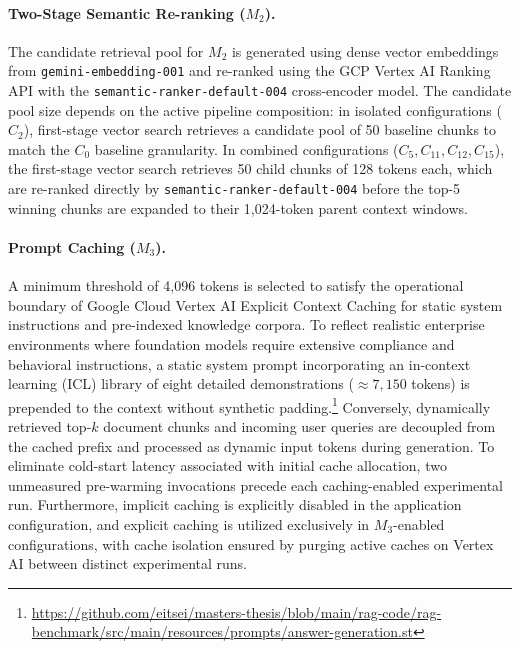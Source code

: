 \paragraph{Two-Stage Semantic Re-ranking ($M_2$).}
The candidate retrieval pool for $M_2$ is generated using dense vector embeddings from \texttt{gemini-embedding-001} and re-ranked using the GCP Vertex AI Ranking API with the \texttt{semantic-\allowbreak{}ranker-\allowbreak{}default-\allowbreak{}004} cross-encoder model. The candidate pool size depends on the active pipeline composition: in isolated configurations ($C_2$), first-stage vector search retrieves a candidate pool of 50 baseline chunks to match the $C_0$ baseline granularity. In combined configurations ($C_5, C_{11}, C_{12}, C_{15}$), the first-stage vector search retrieves 50 child chunks of 128 tokens each, which are re-ranked directly by \texttt{semantic-\allowbreak{}ranker-\allowbreak{}default-\allowbreak{}004} before the top-5 winning chunks are expanded to their 1,024-token parent context windows.

\paragraph{Prompt Caching ($M_3$).}
A minimum threshold of 4,096 tokens is selected to satisfy the operational boundary of Google Cloud Vertex AI Explicit Context Caching for static system instructions and pre-indexed knowledge corpora. To reflect realistic enterprise environments where foundation models require extensive compliance and behavioral instructions, a static system prompt incorporating an in-context learning (ICL) library of eight detailed demonstrations ($\approx 7{,}150$ tokens) is prepended to the context without synthetic padding.\footnote{\url{https://github.com/eitsei/masters-thesis/blob/main/rag-code/rag-benchmark/src/main/resources/prompts/answer-generation.st}} Conversely, dynamically retrieved top-$k$ document chunks and incoming user queries are decoupled from the cached prefix and processed as dynamic input tokens during generation. To eliminate cold-start latency associated with initial cache allocation, two unmeasured pre-warming invocations precede each caching-enabled experimental run. Furthermore, implicit caching is explicitly disabled in the application configuration, and explicit caching is utilized exclusively in $M_3$-enabled configurations, with cache isolation ensured by purging active caches on Vertex AI between distinct experimental runs.

